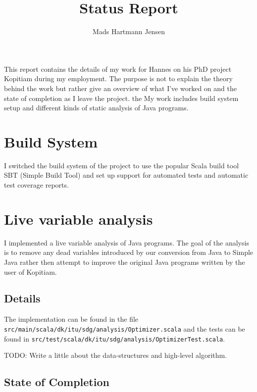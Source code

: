 \documentclass[11pt]{exam}
\title{Status Report}
\author{Mads Hartmann Jensen}
\begin{document}
\maketitle{}

\paragraph{} This report contains the details of my work for Hannes on his PhD project Kopitiam during my employment. The purpose is not to explain the theory behind the work but rather give an overview of what I've worked on and the state of completion as I leave the project. the My work includes build system setup and different kinds of static analysis of Java programs. \newline \newline

\tableofcontents

\newpage

\section{Build System}

I switched the build system of the project to use the popular Scala build tool SBT (Simple Build Tool) and set up support for automated tests and automatic test coverage reports.

\section{Live variable analysis}

I implemented a live variable analysis of Java programs. The goal of the analysis is to remove any dead variables introduced by our conversion from Java to Simple Java rather then attempt to improve the original Java programs written by the user of Kopitiam.

\subsection{Details}

The implementation can be found in the file \texttt{src/main/scala/dk/itu/sdg/analysis/Optimizer.scala} and the tests can be found in \texttt{src/test/scala/dk/itu/sdg/analysis/OptimizerTest.scala}. \newline

TODO: Write a little about the data-structures and high-level algorithm.

\subsection{State of Completion}
\end{document}
